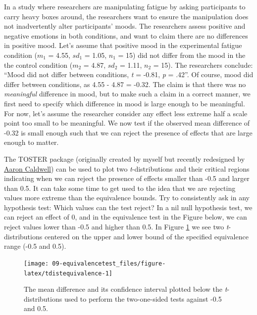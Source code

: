 \documentclass[
  oneside]{krantz}
\begin{document}
In a study where researchers are manipulating fatigue by asking participants to carry heavy boxes around, the researchers want to ensure the manipulation does not inadvertently alter participants' moods. The researchers assess positive and negative emotions in both conditions, and want to claim there are no differences in positive mood. Let's assume that positive mood in the experimental fatigue condition (\(m_1\) = 4.55, \(sd_1\) = 1.05, \(n_1\) = 15) did not differ from the mood in the the control condition (\(m_2\) = 4.87, \(sd_2\) = 1.11, \(n_2\) = 15). The researchers conclude: ``Mood did not differ between conditions, \emph{t} = -0.81, \emph{p} = .42''. Of course, mood did differ between conditions, as 4.55 - 4.87 = -0.32. The claim is that there was no \emph{meaningful} difference in mood, but to make such a claim in a correct manner, we first need to specify which difference in mood is large enough to be meaningful. For now, let's assume the researcher consider any effect less extreme half a scale point too small to be meaningful. We now test if the observed mean difference of -0.32 is small enough such that we can reject the presence of effects that are large enough to matter.

The TOSTER package (originally created by myself but recently redesigned by \href{https://aaroncaldwell.us/}{Aaron Caldwell}) can be used to plot two \emph{t}-distributions and their critical regions indicating when we can reject the presence of effects smaller than -0.5 and larger than 0.5. It can take some time to get used to the idea that we are rejecting values more extreme than the equivalence bounds. Try to consistently ask in any hypothesis test: Which values can the test reject? In a nil null hypothesis test, we can reject an effect of 0, and in the equivalence test in the Figure below, we can reject values lower than -0.5 and higher than 0.5. In Figure \ref{fig:tdistequivalence} we see two \emph{t}-distributions centered on the upper and lower bound of the specified equivalence range (-0.5 and 0.5).



\begin{figure}

{\centering \texttt{[image: 09-equivalencetest\_files/figure-latex/tdistequivalence-1]} 

}

\caption{The mean difference and its confidence interval plotted below the \emph{t}-distributions used to perform the two-one-sided tests against -0.5 and 0.5.}\label{fig:tdistequivalence}
\end{figure}
\end{document}
